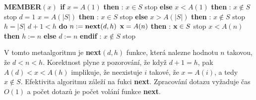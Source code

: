 \documentclass[a4paper,12pt]{article}
\begin{document}
{\bf MEMBER$(x)$\newline 
if} $x=A(1)$ {\bf then}\newline 
\phantom{---}{\bf Výstup}: $x\in S$ stop\newline 
{\bf else}\newline 
\phantom{---}{\bf if} $x<A(1)$ {\bf then}\newline 
\phantom{------}{\bf Výstup}: $x\notin S$ stop\newline 
\phantom{---}{\bf else}\newline 
\phantom{------}$d=1$\newline 
\phantom{---}{\bf endif\newline
\bf endif\newline 
if} $x=A(|S|)$ {\bf then}\newline 
\phantom{---}{\bf Výstup}: $x\in S$ stop\newline 
{\bf else}\newline 
\phantom{---}{\bf if} $x>A(|S|)$ {\bf then}\newline 
\phantom{------}{\bf Výstup}: $x\notin S$ stop\newline 
\phantom{---}{\bf else}\newline 
\phantom{------}$h=|S|$\newline 
\phantom{---}{\bf endif\newline
endif\newline 
while} $d+1<h$ {\bf do}\newline 
\phantom{---}$n:=\text{{\bf next}}(d,h)$\newline 
\phantom{---}{\bf if} $\bold x=A(n)$ {\bf then}\newline 
\phantom{------}{\bf Výstup}: $\bold x\in S$ stop\newline 
\phantom{---}{\bf else}\newline 
\phantom{------}{\bf if} $x<A(n)$ {\bf then} $h:=n$ {\bf else} $d:=n$ {\bf endif}\newline 
\phantom{---}{\bf endif\newline 
enddo\newline 
Výstup}: $x\notin S$ stop

V tomto metaalgoritmu je {\bf next$(d,h)$} funkce, která 
nalezne hodnotu $n$ takovou, že $d<n<h$. Korektnost plyne 
z pozorování, že když $d+1=h$, pak $A(d)<x<A(h)$ 
implikuje, že neexistuje $i$ takové, že $x=A(i)$, a tedy 
$x\notin S$. Efektivita algoritmu záleží na fukci {\bf next}. 
Zpracování dotazu vyžaduje čas $O(1)$ a počet 
dotazů je 
počet volání funkce {\bf next}. 
\end{document}
